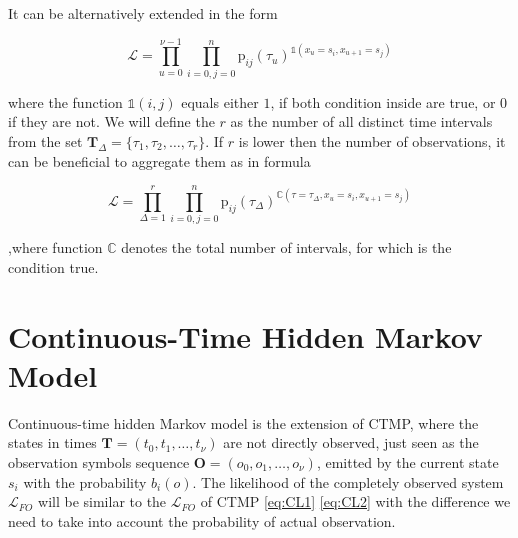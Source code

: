 \documentclass[thesis=M,english]{FITthesis}[2012/10/20]
\newcommand{\matr}[1]{\mathbf{#1}}
\begin{document}
It can be alternatively extended in the form

\begin{equation}
 \mathcal{L} = \prod_{u=0}^{\nu-1} \prod_{i=0,j=0}^{n}  \mathrm{p}_{ij}(\tau_u)^{\mathds{1}( x_u = s_i, x_{u+1} = s_j )} 
\end{equation}

where the function $\mathds{1}(i,j)$ equals either $1$, if both condition inside are true, or $0$ if they are not. 
We will define the $r$ as the number of all distinct time intervals from the set $ \matr{T}_{\Delta} = \{ \tau_1,\tau_2,\dots,\tau_r\}$. If $r$ is lower then the number of observations, it can be beneficial to aggregate them as in formula

\begin{equation}\label{eq:CTL}
 \mathcal{L} = \prod_{\Delta = 1}^{r} \prod_{i=0,j=0}^{n}  \mathrm{p}_{ij}(\tau_{\Delta})^{\mathbb{C}( \tau=\tau_{\Delta}, x_u = s_i, x_{u+1} = s_j )} 
\end{equation}

,where function $\mathbb{C}$ denotes the total number of intervals, for which is the condition true.
    

\section{Continuous-Time Hidden Markov Model}



Continuous-time hidden Markov model is the extension of CTMP, where the states in times $\matr{T} = ( t_0, t_1, \dots, t_{\nu} )$ are not directly observed, just seen as the observation symbols sequence $\matr{O} = (  o_0, o_1, \dots, o_{\nu} )$, emitted by the current state $s_i$ with the probability $b_i(o)$.
The likelihood of the completely observed system  $\mathcal{L}_{FO}$ will be similar to the $\mathcal{L}_{FO}$ of CTMP \eqref{eq:CL1} \eqref{eq:CL2} with the difference we need to take into account the probability of actual observation.
\end{document}
